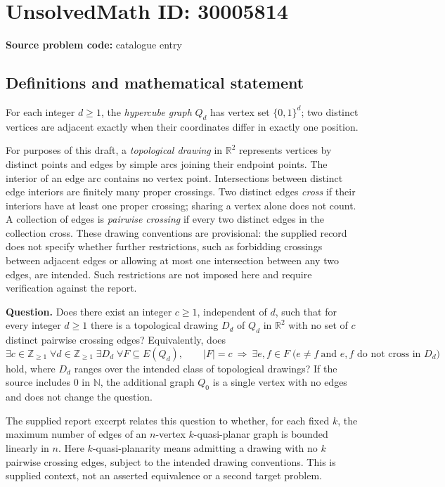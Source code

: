 \documentclass[11pt]{article}
\newcommand{\N}{\mathbb{N}}
\newcommand{\Z}{\mathbb{Z}}
\newcommand{\R}{\mathbb{R}}
\begin{document}
\section*{UnsolvedMath ID: 30005814}
\textbf{Source problem code:} catalogue entry
\subsection{Definitions and mathematical statement}
For each integer \(d\geq 1\), the \emph{hypercube graph} \(Q_d\) has vertex set \(\{0,1\}^d\); two distinct vertices are adjacent exactly when their coordinates differ in exactly one position.

For purposes of this draft, a \emph{topological drawing} in \(\R^2\) represents vertices by distinct points and edges by simple arcs joining their endpoint points. The interior of an edge arc contains no vertex point. Intersections between distinct edge interiors are finitely many proper crossings. Two distinct edges \emph{cross} if their interiors have at least one proper crossing; sharing a vertex alone does not count. A collection of edges is \emph{pairwise crossing} if every two distinct edges in the collection cross. These drawing conventions are provisional: the supplied record does not specify whether further restrictions, such as forbidding crossings between adjacent edges or allowing at most one intersection between any two edges, are intended. Such restrictions are not imposed here and require verification against the report.

\textbf{Question.} Does there exist an integer \(c\geq 1\), independent of \(d\), such that for every integer \(d\geq 1\) there is a topological drawing \(D_d\) of \(Q_d\) in \(\R^2\) with no set of \(c\) distinct pairwise crossing edges? Equivalently, does
\[
\exists c\in\Z_{\geq 1}\;\forall d\in\Z_{\geq 1}\;\exists D_d\;\forall F\subseteq E(Q_d),\qquad
|F|=c\ \Longrightarrow\ \exists e,f\in F\;\bigl(e\neq f\ \text{and }e,f\text{ do not cross in }D_d\bigr)
\]
hold, where \(D_d\) ranges over the intended class of topological drawings? If the source includes \(0\) in \(\N\), the additional graph \(Q_0\) is a single vertex with no edges and does not change the question.

The supplied report excerpt relates this question to whether, for each fixed \(k\), the maximum number of edges of an \(n\)-vertex \(k\)-quasi-planar graph is bounded linearly in \(n\). Here \(k\)-quasi-planarity means admitting a drawing with no \(k\) pairwise crossing edges, subject to the intended drawing conventions. This is supplied context, not an asserted equivalence or a second target problem.
\end{document}
